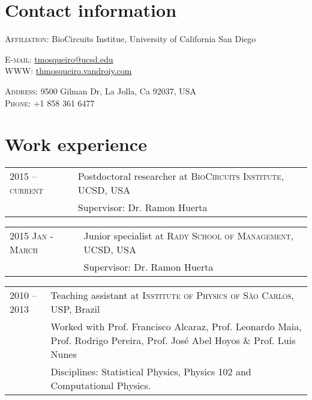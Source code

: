 \documentclass[letter,10pt]{article} %
\begin{document}
\par{\bigskip\par}

\vspace{-0.5cm}
{\bigskip\par}

\section{Contact information}

\textsc{Affiliation:} BioCircuits Institue, University of California San Diego

\begin{minipage}{0.4\textwidth}
  \textsc{E-mail:} \href{mailto:tmosqueiro@ucsd.edu}{tmosqueiro@ucsd.edu} \\
  \textsc{WWW:} \href{http://thmosqueiro.vandroiy.com}{thmosqueiro.vandroiy.com}
\end{minipage}
\begin{minipage}{0.5\textwidth}
  \textsc{Address:} 9500 Gilman Dr, La Jolla, Ca 92037, USA \\
  \textsc{Phone:} +1 858 361 6477
\end{minipage}



\section{Work experience}

\begin{tabular}{p{2.8cm}|p{11cm}}
  \textsc{2015 -- current} & Postdoctoral researcher at \textsc{BioCircuits Institute}, UCSD, USA \emph{}\\
  & \footnotesize{Supervisor: Dr. Ramon Huerta}
\end{tabular}

\begin{tabular}{p{2.8cm}|p{11cm}}
  \textsc{2015 Jan - March} & Junior specialist at \textsc{Rady School of Management}, UCSD, USA \emph{}\\
  & \footnotesize{Supervisor: Dr. Ramon Huerta}
\end{tabular}

\begin{tabular}{p{2.8cm}|p{11cm}}
  \textsc{2010 -- 2013} & Teaching assistant at \textsc{Institute of Physics of S\~ao Carlos}, USP, Brazil\\
  & \footnotesize{Worked with Prof. Francisco Alcaraz, Prof. Leonardo Maia, Prof. Rodrigo Pereira, Prof. Jos\'e Abel Hoyos \& Prof. Luis Nunes}\\
  & \footnotesize{Disciplines: Statistical Physics, Physics 102 and Computational Physics.}
\end{tabular}
\end{document}
